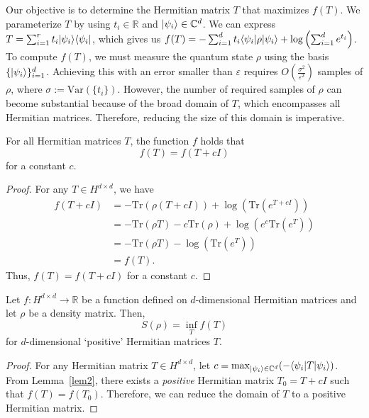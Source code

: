 \documentclass[aps,groupedaddress,superscriptaddress,amssymb,amsmath,amsbsy,amsfonts,twocolumn,pra]{revtex4}
\begin{document}
Our objective is to determine the Hermitian matrix $T$ that maximizes $f(T)$. We parameterize $T$ by using $t_i \in \mathbb{R}$ and $|\psi_i\rangle \in \mathbb{C}^d$. We can express $T = \sum_{i=1}^r t_i |\psi_i\rangle\langle\psi_i|$, which gives us $f(T) = -\sum_{i=1}^d t_i \langle\psi_i|\rho|\psi_i\rangle + \log\left(\sum_{i=1}^d e^{t_i}\right)$. To compute $f(T)$, we must measure the quantum state $\rho$ using the basis $\{|\psi_i\rangle\}_{i=1}^d$. Achieving this with an error smaller than $\varepsilon$ requires $O(\frac{\sigma^2}{\varepsilon^{2}})$ samples of $\rho$, where $\sigma:=\text{Var}(\{t_i\})$. However, the number of required samples of $\rho$ can become substantial because of the broad domain of $T$, which encompasses all Hermitian matrices. Therefore, reducing the size of this domain is imperative.

\begin{lemma} \label{lem2}
For all Hermitian matrices $T$, the function $f$ holds that
\begin{equation} \label{identity}
f(T) = f(T+cI) 
\end{equation}
for a constant $c$.
\end{lemma}

\begin{proof}
For any $T \in H^{d \times d}$, we have
\begin{align*}
f(T+cI) &= -\text{Tr}(\rho(T+cI)) + \log\left(\text{Tr}(e^{T+cI})\right) \\
&= -\text{Tr}(\rho T) - c\text{Tr}(\rho) + \log\left(e^c\text{Tr}(e^T)\right) \\
&= -\text{Tr}(\rho T) - \log\left(\text{Tr}(e^T)\right) \\
&= f(T).
\end{align*}
Thus, $f(T) = f(T+cI)$ for a constant $c$.
\end{proof}

\begin{proposition} \label{}
Let $f: H^{d \times d} \rightarrow \mathbb{R}$ be a function defined on $d$-dimensional Hermitian matrices and let $\rho$ be a density matrix. Then,
\begin{equation} \label{identity}
S(\rho) = \inf_Tf(T)
\end{equation}
for $d$-dimensional `positive' Hermitian matrices $T$.
\end{proposition}

\begin{proof}
For any Hermitian matrix $T \in H^{d \times d}$, let $c = \max_{|\psi_i\rangle\in \mathbb{C}^d}(-\langle\psi_i|T|\psi_i\rangle)$. From Lemma~\ref{lem2}, there exists a \emph{positive} Hermitian matrix $T_0 = T+cI$ such that $f(T)=f(T_0)$. Therefore, we can reduce the domain of $T$ to a positive Hermitian matrix.
\end{proof}
\end{document}
